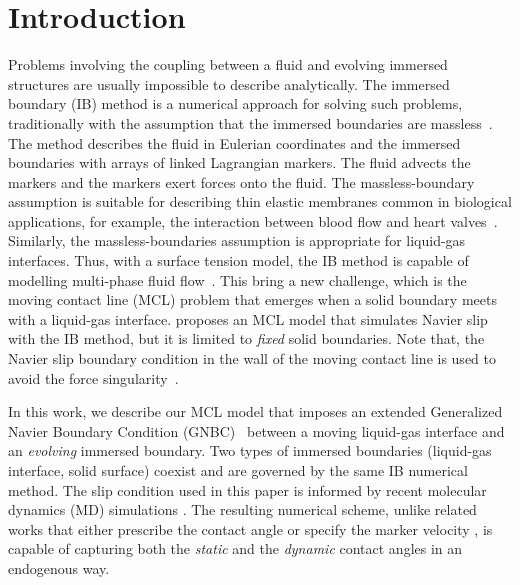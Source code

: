 \documentclass{jfm}
\begin{document}
\section{Introduction}
Problems involving the coupling between a fluid and evolving immersed structures are usually impossible to describe analytically. The immersed boundary (IB) method is a numerical approach for solving such problems, traditionally with the assumption that the immersed boundaries are massless~\citep{peskin1972flow}. The method describes the fluid in Eulerian coordinates and the immersed boundaries with arrays of linked Lagrangian markers. The fluid advects the markers and the markers exert forces onto the fluid. The massless-boundary assumption is suitable for describing thin elastic membranes common in biological applications, for example, the interaction between blood flow and heart valves~\citep{peskin1972flow}. Similarly, the massless-boundaries assumption is appropriate for liquid-gas interfaces. Thus, with a surface tension model, the IB method is capable of modelling multi-phase fluid flow~\citep{leveque1997immersed, lorstad2004assessment, popinet2018numerical,  huang2018improved}. This bring a new challenge, which is the moving contact line (MCL) problem that emerges when a solid boundary meets with a liquid-gas interface. \citet{lai2010numerical} proposes an MCL model that simulates Navier slip with the IB method, but it is limited to \textit{fixed} solid boundaries. Note that, the Navier slip boundary condition in the wall of the moving contact line is used to avoid the force singularity~\citep{lai2010numerical}. 


In this work, we describe our MCL model that imposes an extended Generalized Navier Boundary Condition (GNBC)~\citep{quian2003generalized} between a moving liquid-gas interface and an \textit{evolving} immersed boundary. Two types of immersed boundaries (liquid-gas interface, solid surface) coexist and are governed by the same IB numerical method. The slip condition used in this paper is informed by recent molecular dynamics (MD) simulations \citep{johansson2018molecular}. The resulting numerical scheme, unlike related works that either prescribe the contact angle \citep{muradoglu2010front,liu2015diffuse} or specify the marker velocity \citep{manservisi2009variational}, is capable of capturing both the \textit{static} and the \textit{dynamic} contact angles in an endogenous way. 
\end{document}
